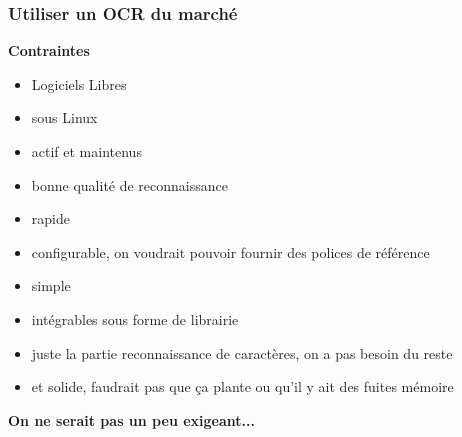 \documentclass[xcolor=dvipsnames]{beamer}
\begin{document}
\begin{frame}
\frametitle{Utiliser un OCR du marché}
    \begin{center}\begin{alertblock}{}
            \textbf{\Large Contraintes}
        \begin{itemize}
        \item Logiciels Libres
        \item sous Linux
        \item actif et maintenus        
        \item bonne qualité de reconnaissance
        \item rapide
        \item configurable, on voudrait pouvoir fournir des polices de référence
        \item simple
        \item intégrables sous forme de librairie
        \item juste la partie reconnaissance de caractères, on a pas besoin du reste
        \item et solide, faudrait pas que ça plante ou qu'il y ait des fuites mémoire
        \end{itemize}
    \end{alertblock}\end{center}
    \begin{center}\begin{alertblock}{}
            \begin{center}\textbf{\Large On ne serait pas un peu exigeant...}\end{center}
    \end{alertblock}\end{center}
\end{frame}
\end{document}
